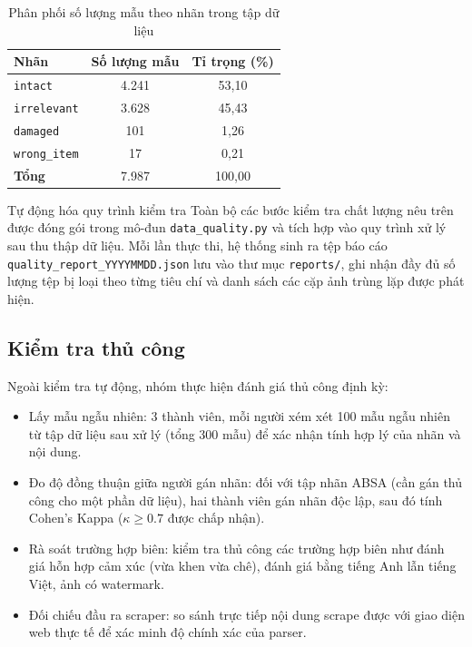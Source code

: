 \begin{table}[H]
    \centering
    \caption{Phân phối số lượng mẫu theo nhãn trong tập dữ liệu}
    \label{tab:class_distribution}
    \begin{tabular}{lcc}
        \hline
        \textbf{Nhãn} & \textbf{Số lượng mẫu} & \textbf{Tỉ trọng (\%)} \\
        \hline
        \texttt{intact}      & 4.241 & 53,10 \\
        \texttt{irrelevant}  & 3.628 & 45,43 \\
        \texttt{damaged}     &   101 &  1,26 \\
        \texttt{wrong\_item} &    17 &  0,21 \\
        \hline
        \textbf{Tổng}        & 7.987 & 100,00 \\
        \hline
    \end{tabular}
\end{table}

\begin{notebox}{Tự động hóa quy trình kiểm tra}
Toàn bộ các bước kiểm tra chất lượng nêu trên được đóng gói trong mô-đun \texttt{data\_quality.py} và tích hợp vào quy trình xử lý sau thu thập dữ liệu. Mỗi lần thực thi, hệ thống sinh ra tệp báo cáo \texttt{quality\_report\_YYYYMMDD.json} lưu vào thư mục \texttt{reports/}, ghi nhận đầy đủ số lượng tệp bị loại theo từng tiêu chí và danh sách các cặp ảnh trùng lặp được phát hiện.
\end{notebox}

\subsection{Kiểm tra thủ công}

Ngoài kiểm tra tự động, nhóm thực hiện đánh giá thủ công định kỳ:

\begin{itemize}[labelsep=10pt, leftmargin=2cm]
    \item Lấy mẫu ngẫu nhiên: 3 thành viên, mỗi người xém xét 100 mẫu ngẫu nhiên từ tập dữ liệu sau xử lý (tổng 300 mẫu) để xác nhận tính hợp lý của nhãn và nội dung.
    \item Đo độ đồng thuận giữa người gán nhãn: đối với tập nhãn ABSA (cần gán thủ công cho một phần dữ liệu), hai thành viên gán nhãn độc lập, sau đó tính Cohen's Kappa ($\kappa \geq 0.7$ được chấp nhận).
    \item Rà soát trường hợp biên: kiểm tra thủ công các trường hợp biên như đánh giá hỗn hợp cảm xúc (vừa khen vừa chê), đánh giá bằng tiếng Anh lẫn tiếng Việt, ảnh có watermark.
    \item Đối chiếu đầu ra scraper: so sánh trực tiếp nội dung scrape được với giao diện web thực tế để xác minh độ chính xác của parser.
\end{itemize}

